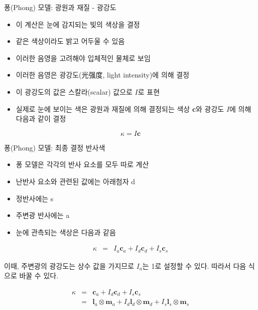 \begin{frame}[fragile]{퐁(Phong) 모델: 광원과 재질 - 광강도}

\begin{itemize}
\item 이 계산은 눈에 감지되는 빛의 색상을 결정
\item 같은 색상이라도 밝고 어두울 수 있음
\item 이러한 음영을 고려해야 입체적인 물체로 보임
\item 이러한 음영은 광강도(光强度, light intensity)에 의해 결정
\item 이 광강도의 값은 스칼라(scalar) 값으로 $I$로 표현
\item 실제로 눈에 보이는 색은 광원과 재질에 의해 결정되는 색상 $\mathbf c$와 광강도 $I$에 의해 다음과 같이 결정
\end{itemize}

$$\kappa = I \mathbf c$$

\end{frame}

\begin{frame}[fragile]{퐁(Phong) 모델: 최종 결정 반사색}

\begin{itemize}
\item 퐁 모델은 각각의 반사 요소를 모두 따로 계산
\item 난반사 요소와 관련된 값에는 아래첨자 d
\item 정반사에는 s
\item 주변광 반사에는 a
\item 눈에 관측되는 색상은 다음과 같음
\end{itemize}

\begin{eqnarray}
\kappa & = & I_a \mathbf c_a + I_d \mathbf c_d + I_s \mathbf c_s \nonumber
\end{eqnarray}

이때, 주변광의 광강도는 상수 값을 가지므로 $I_a$는 1로 설정할 수 있다. 따라서 다음 식으로 바꿀 수 있다.

\begin{eqnarray} \nonumber
\kappa & = & \mathbf c_a + I_d \mathbf c_d + I_s \mathbf c_s \\ \nonumber 
&  =  & \mathbf l_a \otimes \mathbf m_a + I_d \mathbf l_d \otimes \mathbf m_d + I_s \mathbf l_s \otimes \mathbf m_s \nonumber
\end{eqnarray}

\end{frame}

